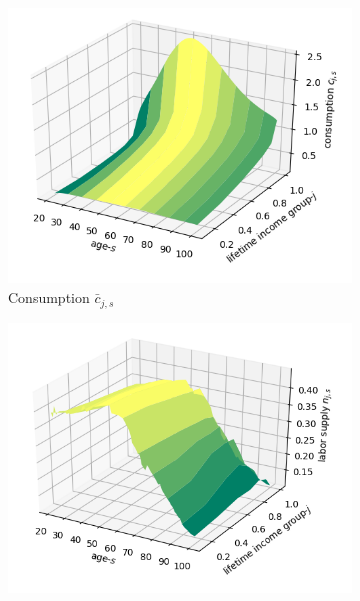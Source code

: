   \begin{figure}[htb]\centering \captionsetup{width=6.0in}
    \caption{\label{FigSSeqlbHHvars}\textbf{Steady-state distributions of household consumption $\bar{c}_{j,s}$, labor supply $\bar{n}_{j,s}$, and savings $\bar{b}_{j,s+1}$}}
    \begin{subfigure}[b]{0.48\textwidth}
      \includegraphics[width=\textwidth]{images/HHcons_SS.png}
      \caption{Consumption $\bar{c}_{j,s}$}
      \label{FigSSeqlbHHcons}
    \end{subfigure}
    \begin{subfigure}[b]{0.48\textwidth}
      \includegraphics[width=\textwidth]{images/HHlab_SS.png}

\end{subfigure}
\end{figure}
